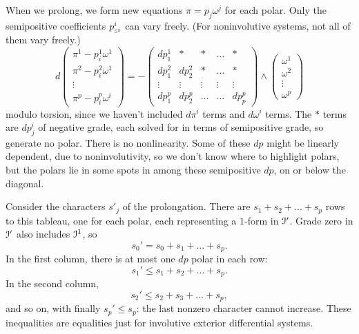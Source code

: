 %
When we prolong, we form new equations \(\pi=p_j\omega^j\) for each polar.
Only the semipositive coefficients \(p^i_{\legr{i}}\) can vary freely. (For noninvolutive systems, not all of them vary freely.)
\[
d
\begin{pmatrix}
\pi^1-p^1_i\omega^1\\
\pi^2-p^2_i\omega^1\\
\vdots\\
\pi^p-p^p_i\omega^i
\end{pmatrix}
=
-
\begin{pmatrix}
dp^1_1 & *      & *      & \dots  & * \\
dp^2_1 & dp^2_2 & *      & \dots  & * \\
\vdots & \vdots & \vdots & \vdots & \vdots \\
dp^p_1 & dp^p_2 & \dots  & \dots  & dp^p_p
\end{pmatrix}
\wedge
\begin{pmatrix}
\omega^1 \\
\omega^2\\
\vdots\\
\omega^p
\end{pmatrix}
\]
modulo torsion, since we haven't included \(d\pi^i\) terms and \(d\omega^i\) terms.
The \(*\) terms are \(dp^i_j\) of negative grade, each solved for in terms of semipositive grade, so generate no polar.
There is no nonlinearity.
Some of these \(dp\) might be linearly dependent, due to noninvolutivity, so we don't know where to highlight polars, but the polars lie in some spots in among these semipositive \(dp\), on or below the diagonal.

Consider the characters \(s'_j\) of the prolongation.
There are \(s_1+s_2+\dots+s_p\) rows to this tableau, one for each polar, each representing a \(1\)-form in \(\mathcal{I}'\).
Grade zero in \(\mathcal{I}'\) also includes \(\mathcal{I}^1\), so
\[
s_0'=s_0+s_1+\dots+s_p.
\]
In the first column, there is at most one \(dp\) polar in each row:
\[
s_1'\le s_1+s_2+\dots+s_p.
\]
In the second column, 
\[
s_2'\le s_2+s_3+\dots+s_p,
\]
and so on, with finally \(s_p'\le s_p\): the last nonzero character cannot increase.
These inequalities are equalities just for involutive exterior differential systems.
